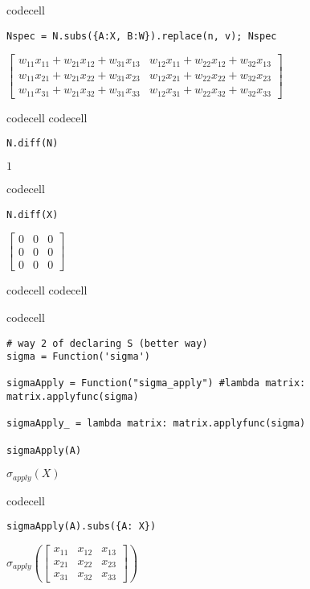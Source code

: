 codecell

\begin{verbatim}
Nspec = N.subs({A:X, B:W}).replace(n, v); Nspec
\end{verbatim}

$\displaystyle \left[\begin{matrix}w_{11} x_{11} + w_{21} x_{12} + w_{31} x_{13} & w_{12} x_{11} + w_{22} x_{12} + w_{32} x_{13}\\w_{11} x_{21} + w_{21} x_{22} + w_{31} x_{23} & w_{12} x_{21} + w_{22} x_{22} + w_{32} x_{23}\\w_{11} x_{31} + w_{21} x_{32} + w_{31} x_{33} & w_{12} x_{31} + w_{22} x_{32} + w_{32} x_{33}\end{matrix}\right]$

codecell
codecell

\begin{verbatim}
N.diff(N)
\end{verbatim}

$\displaystyle 1$

codecell

\begin{verbatim}
N.diff(X)
\end{verbatim}

$\displaystyle \left[\begin{matrix}0 & 0 & 0\\0 & 0 & 0\\0 & 0 & 0\end{matrix}\right]$

codecell
codecell




codecell

\begin{verbatim}
# way 2 of declaring S (better way)
sigma = Function('sigma')

sigmaApply = Function("sigma_apply") #lambda matrix:  matrix.applyfunc(sigma)

sigmaApply_ = lambda matrix: matrix.applyfunc(sigma)

sigmaApply(A)
\end{verbatim}

$\displaystyle \sigma_{apply}{\left(X \right)}$

codecell

\begin{verbatim}
sigmaApply(A).subs({A: X})
\end{verbatim}

$\displaystyle \sigma_{apply}{\left(\left[\begin{matrix}x_{11} & x_{12} & x_{13}\\x_{21} & x_{22} & x_{23}\\x_{31} & x_{32} & x_{33}\end{matrix}\right] \right)}$

